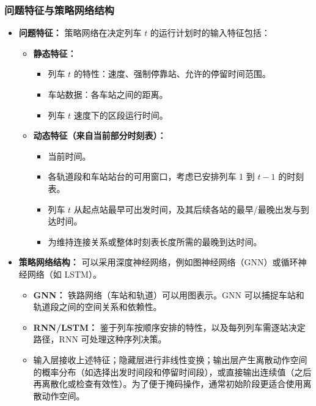 \documentclass{article}
\begin{document}
    \subsubsection{问题特征与策略网络结构}
    \begin{itemize}
        \item \textbf{问题特征：}
        策略网络在决定列车 $t$ 的运行计划时的输入特征包括：
        \begin{itemize}
            \item \textbf{静态特征：}
            \begin{itemize}
                \item 列车 $t$ 的特性：速度、强制停靠站、允许的停留时间范围。
                \item 车站数据：各车站之间的距离。
                \item 列车 $t$ 速度下的区段运行时间。
            \end{itemize}
            \item \textbf{动态特征（来自当前部分时刻表）：}
            \begin{itemize}
                \item 当前时间。
                \item 各轨道段和车站站台的可用窗口，考虑已安排列车 1 到 $t-1$ 的时刻表。
                \item 列车 $t$ 从起点站最早可出发时间，及其后续各站的最早/最晚出发与到达时间。
                \item 为维持连接关系或整体时刻表长度所需的最晚到达时间。
            \end{itemize}
        \end{itemize}

        \item \textbf{策略网络结构：}
        可以采用深度神经网络，例如图神经网络（GNN）或循环神经网络（如 LSTM）。
        \begin{itemize}
            \item \textbf{GNN：} 铁路网络（车站和轨道）可以用图表示。GNN 可以捕捉车站和轨道段之间的空间关系和依赖性。
            \item \textbf{RNN/LSTM：} 鉴于列车按顺序安排的特性，以及每列列车需逐站决定路径，RNN 可处理这种序列决策。
            \item 输入层接收上述特征；隐藏层进行非线性变换；输出层产生离散动作空间的概率分布（如选择出发时间段和停留时间段），或直接输出连续值（之后再离散化或检查有效性）。为了便于掩码操作，通常初始阶段更适合使用离散动作空间。
        \end{itemize}
    \end{itemize}
\end{document}
